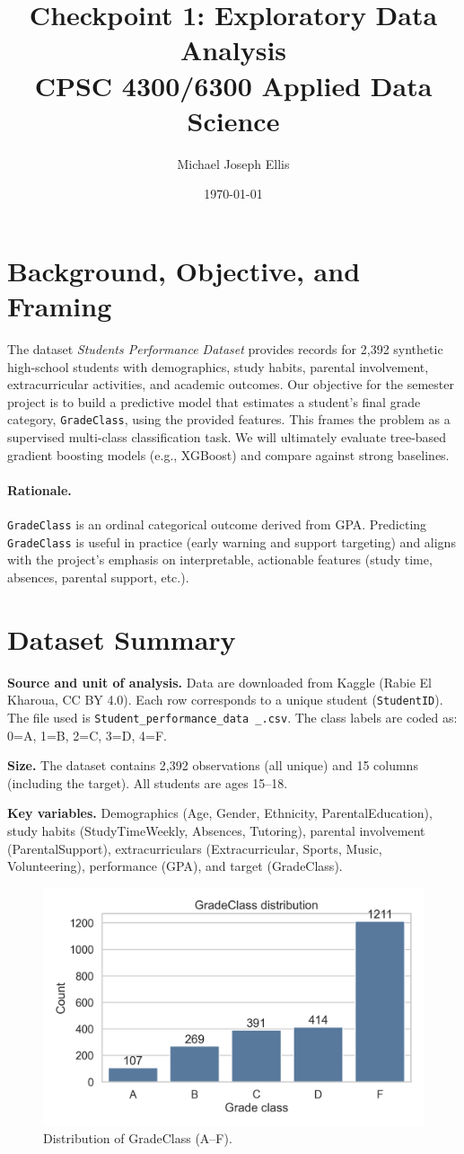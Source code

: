 \documentclass[11pt]{article}
\title{Checkpoint 1: Exploratory Data Analysis\\CPSC 4300/6300 Applied Data Science}
\author{Michael Joseph Ellis}
\date{\today}
\begin{document}
\maketitle

\section*{Background, Objective, and Framing}
The dataset \emph{Students Performance Dataset} provides records for 2{,}392 synthetic high-school students with demographics, study habits, parental involvement, extracurricular activities, and academic outcomes. Our objective for the semester project is to build a predictive model that estimates a student's final grade category, \texttt{GradeClass}, using the provided features. This frames the problem as a supervised multi-class classification task. We will ultimately evaluate tree-based gradient boosting models (e.g., XGBoost) and compare against strong baselines.

\paragraph{Rationale.} \texttt{GradeClass} is an ordinal categorical outcome derived from GPA. Predicting \texttt{GradeClass} is useful in practice (early warning and support targeting) and aligns with the project's emphasis on interpretable, actionable features (study time, absences, parental support, etc.).

\section*{Dataset Summary}
	\textbf{Source and unit of analysis.} Data are downloaded from Kaggle (Rabie El Kharoua, CC BY 4.0). Each row corresponds to a unique student (\texttt{StudentID}). The file used is \texttt{Student\_performance\_data \_.csv}. The class labels are coded as: 0=A, 1=B, 2=C, 3=D, 4=F.

	\textbf{Size.} The dataset contains 2{,}392 observations (all unique) and 15 columns (including the target). All students are ages 15--18.

	\textbf{Key variables.} Demographics (Age, Gender, Ethnicity, ParentalEducation), study habits (StudyTimeWeekly, Absences, Tutoring), parental involvement (ParentalSupport), extracurriculars (Extracurricular, Sports, Music, Volunteering), performance (GPA), and target (GradeClass).
\begin{figure}[H]
	\centering
	\includegraphics[width=.6\textwidth]{figures/gradeclass_distribution.png}
	\caption{Distribution of GradeClass (A--F).}\label{fig:gradeclass-dist}
\end{figure}
\end{document}
